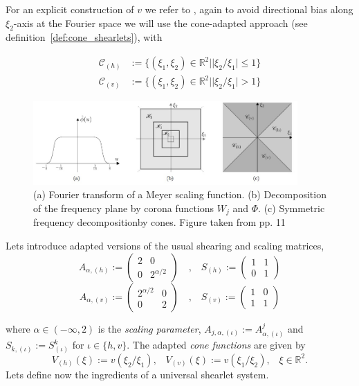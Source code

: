 For an explicit construction of $v$ we refer to \cite{Guo-Labate}, again to avoid directional bias along $\xi_2$-axis at the Fourier space we will use the cone-adapted approach (see definition~\ref{def:cone_shearlets}), with 

$$
\begin{aligned}
\mathcal{C}_{(h)} &:=\{ (\xi_1,\xi_2)\in\mathbb{R}^2||\xi_2/\xi_1|\leq 1\}\\
\mathcal{C}_{(v)} &:=\{ (\xi_1,\xi_2)\in\mathbb{R}^2||\xi_2/\xi_1|>1\}
\end{aligned}
$$

\begin{figure}[h!]
\centering
\includegraphics[width=0.9\textwidth]{./Diagrams/alphapartcones.jpg}
\caption{(a) Fourier transform of a Meyer scaling function. (b) Decomposition of the frequency plane by corona functions $W_j$ and $\Phi$. (c) Symmetric frequency decompositionby cones. Figure taken from \cite{Gitta-alpha} pp. 11}
\label{fig:separable_nonseparable1}
\end{figure}

Lets introduce adapted versions of the usual shearing and scaling matrices,
$$
A_{\alpha,(h)}:=\left(\begin{matrix} 2 & 0 \\ 0 & 2^{\alpha/2}\end{matrix}\right) \quad \textrm{,}\quad S_{(h)}:=\left(\begin{matrix} 1 & 1\\ 0 & 1\end{matrix}\right)
$$
$$
A_{\alpha,(v)}:=\left(\begin{matrix}2^{\alpha/2} & 0 \\ 0 & 2 \end{matrix}\right)\quad \textrm{,}\quad S_{(v)}:=\left(\begin{matrix} 1 & 0 \\ 1 & 1\end{matrix}\right)
$$

where $\alpha\in (-\infty,2)$ is the \textit{scaling parameter}, $A_{j,\alpha,(\iota)}:=A^j_{\alpha,(\iota)}$ and $S_{k,(\iota)}:=S^k_{(\iota)}$ for $\iota\in\{h,v\}$. The adapted \textit{cone functions} are given by
$$
V_{(h)}(\xi):=v(\xi_2/\xi_1)\textrm{,}\quad V_{(v)}(\xi):=v(\xi_1/\xi_2)\textrm{,}\quad \xi\in\mathbb{R}^2.
$$
Lets define now the ingredients of a universal shearlet system.

